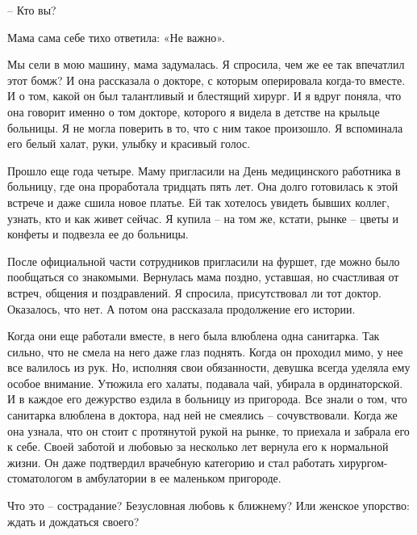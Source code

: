 – Кто вы? 

Мама сама себе тихо ответила: «Не важно». 

Мы сели в мою машину, мама задумалась. Я спросила, чем же ее так впечатлил этот
бомж? И она рассказала о докторе, с которым оперировала когда-то вместе. И о
том, какой он был талантливый и блестящий хирург. И я вдруг поняла, что она
говорит именно о том докторе, которого я видела в детстве на крыльце больницы.
Я не могла поверить в то, что с ним такое произошло. Я вспоминала его белый
халат, руки, улыбку и красивый голос.

Прошло еще года четыре. Маму пригласили на День медицинского работника в
больницу, где она проработала тридцать пять лет. Она долго готовилась к этой
встрече и даже сшила новое платье. Ей так хотелось увидеть бывших коллег,
узнать, кто и как живет сейчас. Я купила – на том же, кстати, рынке – цветы и
конфеты и подвезла ее до больницы.

После официальной части сотрудников пригласили на фуршет, где можно было
пообщаться со знакомыми. Вернулась мама поздно, уставшая, но счастливая от
встреч, общения и поздравлений. Я спросила, присутствовал ли тот доктор.
Оказалось, что нет. А потом она рассказала продолжение его истории. 

Когда они еще работали вместе, в него была влюблена одна санитарка. Так сильно,
что не смела на него даже глаз поднять. Когда он проходил мимо, у нее все
валилось из рук. Но, исполняя свои обязанности, девушка всегда уделяла ему
особое внимание. Утюжила его халаты, подавала чай, убирала в ординаторской. И в
каждое его дежурство ездила в больницу из пригорода. Все знали о том, что
санитарка  влюблена в доктора, над ней не смеялись – сочувствовали. Когда же
она узнала, что он стоит с протянутой рукой на рынке, то приехала и забрала его
к себе. Своей заботой и любовью за несколько лет вернула его к нормальной
жизни. Он даже подтвердил врачебную категорию и стал работать
хирургом-стоматологом в амбулатории в ее маленьком пригороде.

Что это – сострадание? Безусловная любовь к ближнему? Или женское упорство:
ждать и дождаться своего?
